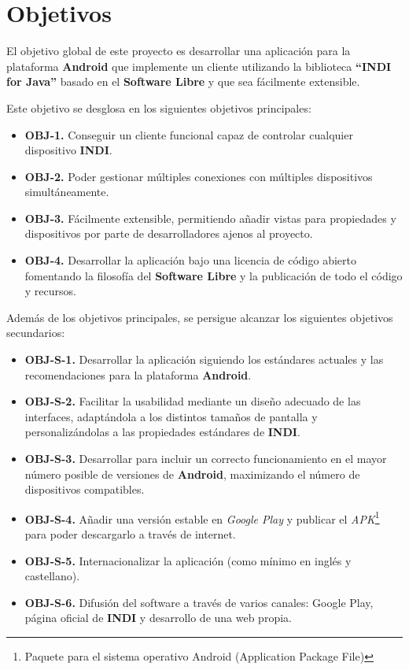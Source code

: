 \chapter{Objetivos}

El objetivo global de este proyecto es desarrollar una aplicación para la plataforma \textbf{Android} que implemente un cliente utilizando la  biblioteca \textbf{``INDI for Java''} basado en el \textbf{Software Libre} y que sea fácilmente extensible.

\bigskip
Este objetivo se desglosa en los siguientes objetivos principales:

\begin{itemize}
  \item \textbf{OBJ-1.} Conseguir un cliente funcional capaz de controlar cualquier dispositivo \textbf{INDI}.
  \item \textbf{OBJ-2.} Poder gestionar múltiples conexiones con múltiples dispositivos simultáneamente.
  \item \textbf{OBJ-3.} Fácilmente extensible, permitiendo añadir vistas para propiedades y  dispositivos por parte de desarrolladores ajenos al proyecto.
  \item \textbf{OBJ-4.} Desarrollar la aplicación bajo una licencia de código abierto fomentando la filosofía del \textbf{Software Libre} y la publicación de todo el código y recursos.
\end{itemize}

\bigskip
Además de los objetivos principales, se persigue alcanzar los siguientes objetivos secundarios:

\begin{itemize}
  \item \textbf{OBJ-S-1.} Desarrollar la aplicación siguiendo los estándares actuales y las recomendaciones para la plataforma \textbf{Android}.
  \item \textbf{OBJ-S-2.} Facilitar la usabilidad mediante un diseño adecuado de las interfaces, adaptándola a los distintos tamaños de pantalla y personalizándolas a las propiedades estándares de \textbf{INDI}.
  \item \textbf{OBJ-S-3.} Desarrollar para incluir un correcto funcionamiento en el mayor número posible de versiones de \textbf{Android}, maximizando el número de dispositivos compatibles.
  \item \textbf{OBJ-S-4.} Añadir una versión estable en \textit{Google Play} y publicar el \textit{APK}\footnote{Paquete para el sistema operativo Android (Application Package File)} para poder descargarlo a través de internet.
  \item \textbf{OBJ-S-5.} Internacionalizar la aplicación (como mínimo en inglés y castellano).
  \item \textbf{OBJ-S-6.} Difusión del software a través de varios canales: Google Play, página oficial de \textbf{INDI} y desarrollo de una web propia.
\end{itemize}

